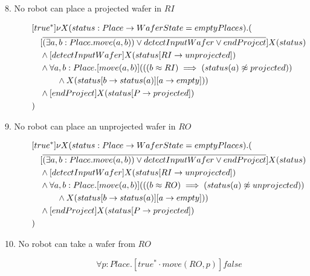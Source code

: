 \begin{description}
 \item[8. No robot can place a projected wafer in $RI$]

\begin{align*}
&[true^*] \nu X(status:Place \to WaferState=emptyPlaces).( \\
&\tab  [\overline{(\exists a,b:Place.move(a,b)) \vee detectInputWafer \vee endProject}]X(status) \\
&\tab  \wedge [detectInputWafer]X(status[RI \to unprojected]) \\
&\tab  \wedge \forall a,b:Place.[move(a, b)](((b \approx RI) \implies (status(a) \not \approx projected)) \\
&\tab\tab\tab \wedge X(status[b \to status(a)][a \to empty])) \\
&\tab  \wedge [endProject]X(status[P \to projected]) \\
&)
\end{align*}

 \item[9. No robot can place an unprojected wafer in $RO$]

\begin{align*}
&[true^*] \nu X(status:Place \to WaferState=emptyPlaces).( \\
&\tab  [\overline{(\exists a,b:Place.move(a,b)) \vee detectInputWafer \vee endProject}]X(status) \\
&\tab  \wedge [detectInputWafer]X(status[RI \to unprojected]) \\
&\tab  \wedge \forall a,b:Place.[move(a, b)](((b \approx RO) \implies (status(a) \not \approx unprojected)) \\
&\tab\tab\tab \wedge X(status[b \to status(a)][a \to empty])) \\
&\tab  \wedge [endProject]X(status[P \to projected]) \\
&)
\end{align*}

 \item[10. No robot can take a wafer from $RO$]

\[
	\forall p:Place . [true^* \cdot move(RO, p)]\mathit{false}
\]

\end{description}
